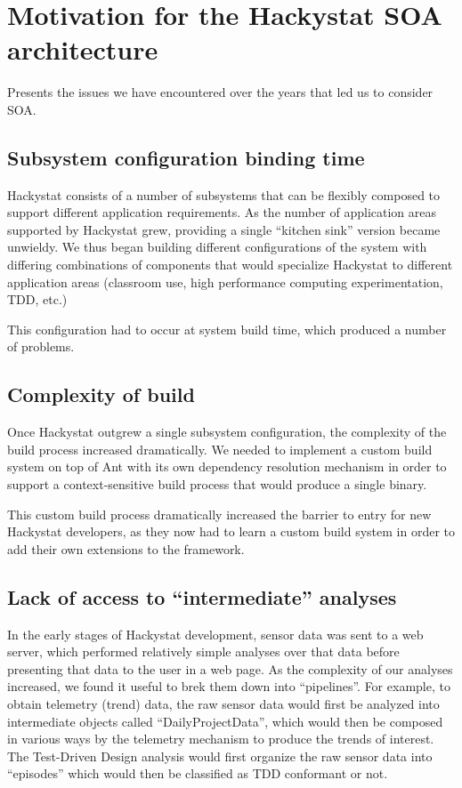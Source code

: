\documentclass[conference,compsoc,peerreview]{IEEEtran}
\begin{document}
\section{Motivation for the Hackystat SOA architecture}
\label{sec:motivation}

Presents the issues we have encountered over the years that led us to consider SOA.

\subsection{Subsystem configuration binding time}

Hackystat consists of a number of subsystems that can be flexibly composed to support different application requirements.  As the number of application areas supported by Hackystat grew, providing a single ``kitchen sink'' version became unwieldy.  We thus began building different configurations of the system with differing combinations of components that would specialize Hackystat to different application areas (classroom use, high performance computing experimentation, TDD, etc.) 

This configuration had to occur at system build time, which produced a number of problems.

\subsection{Complexity of build}

Once Hackystat outgrew a single subsystem configuration, the complexity of the build process increased dramatically. We needed to implement a custom build system on top of Ant with its own dependency resolution mechanism in order to support a context-sensitive build process that would produce a single binary.  

This custom build process dramatically increased the barrier to entry for new Hackystat developers, as they now had to learn a custom build system in order to add their own extensions to the framework.

\subsection{Lack of access to ``intermediate'' analyses}

In the early stages of Hackystat development, sensor data was sent to a web server, which performed relatively simple analyses over that data before presenting that data to the user in a web page.   As the complexity of our analyses increased, we found it useful to brek them down into ``pipelines''.  For example, to obtain telemetry (trend) data, the raw sensor data would first be analyzed into intermediate objects called ``DailyProjectData'', which would then be composed in various ways by the telemetry mechanism to produce the trends of interest.  The Test-Driven Design analysis would first organize the raw sensor data into ``episodes'' which would then be classified as TDD conformant or not. 
\end{document}
